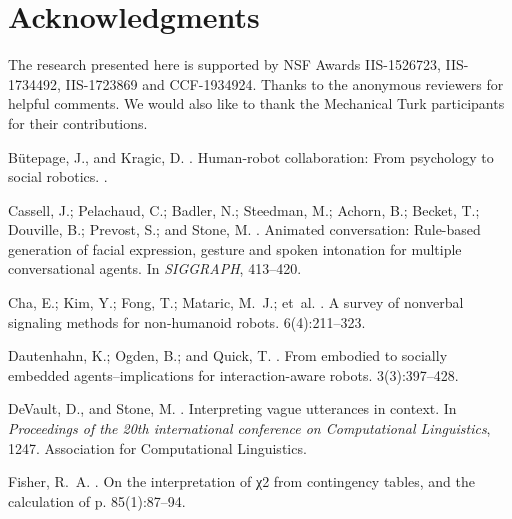 \documentclass[letterpaper]{article} %
\begin{document}
\section{Acknowledgments}
The research presented here is supported by NSF Awards IIS-1526723, IIS-1734492, IIS-1723869 and CCF-1934924. Thanks to the anonymous reviewers for helpful comments. We would also like to thank the Mechanical Turk participants for their contributions.

%  
\begin{thebibliography}{}

B{\"u}tepage, J., and Kragic, D.
.
\newblock Human-robot collaboration: From psychology to social robotics.
.

Cassell, J.; Pelachaud, C.; Badler, N.; Steedman, M.; Achorn, B.; Becket, T.;
  Douville, B.; Prevost, S.; and Stone, M.
.
\newblock Animated conversation: Rule-based generation of facial expression,
  gesture and spoken intonation for multiple conversational agents.
\newblock In {\em SIGGRAPH},  413--420.

Cha, E.; Kim, Y.; Fong, T.; Mataric, M.~J.; et~al.
.
\newblock A survey of nonverbal signaling methods for non-humanoid robots.
  6(4):211--323.

Dautenhahn, K.; Ogden, B.; and Quick, T.
.
\newblock From embodied to socially embedded agents--implications for
  interaction-aware robots.
 3(3):397--428.

DeVault, D., and Stone, M.
.
\newblock Interpreting vague utterances in context.
\newblock In {\em Proceedings of the 20th international conference on
  Computational Linguistics},  1247.
\newblock Association for Computational Linguistics.

Fisher, R.~A.
.
\newblock On the interpretation of χ2 from contingency tables, and the
  calculation of p.
 85(1):87--94.


\end{thebibliography}
\end{document}
